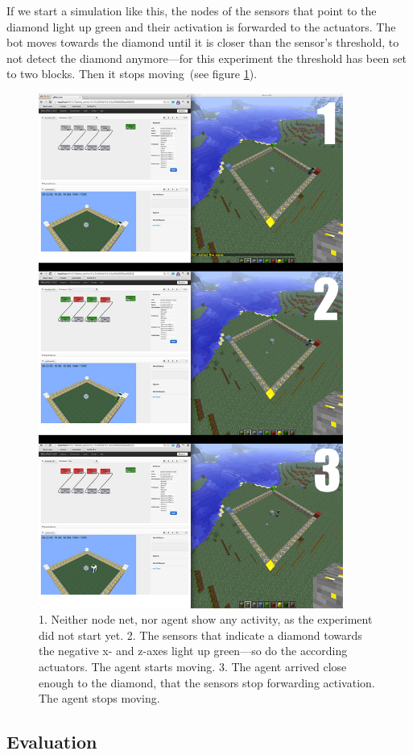 If we start a simulation like this, the nodes of the sensors that point to the diamond light up green and their activation is forwarded to the actuators. The bot moves towards the diamond until it is closer than the sensor's threshold, to not detect the diamond anymore---for this experiment the threshold has been set to two blocks. Then it stops moving~(see figure \ref{diamond_screens}).

\begin{figure}[h]
  \centering
    \includegraphics[width=10cm]{graphics/diamond_screens}
  \caption{1. Neither node net, nor agent show any activity, as the experiment did not start yet.  2. The sensors that indicate a diamond towards the negative x- and z-axes light up green---so do the according actuators. The agent starts moving.  3. The agent arrived close enough to the diamond, that the sensors stop forwarding activation. The agent stops moving.}
  \label{diamond_screens}
\end{figure}

        \subsection{Evaluation}
        
